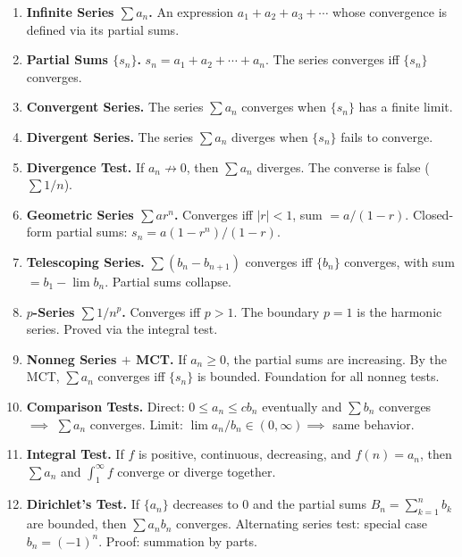 \documentclass[worksheet]{workbook}
\begin{document}
\begin{enumerate}[label=\textbf{\Alph*.}, leftmargin=2.5em, itemsep=1pt]

\item \textbf{Infinite Series $\sum a_n$.}  An expression $a_1 + a_2 + a_3 + \cdots$ whose convergence is defined via its partial sums.

\item \textbf{Partial Sums $\{s_n\}$.}  $s_n = a_1 + a_2 + \cdots + a_n$. The series converges iff $\{s_n\}$ converges.

\item \textbf{Convergent Series.}  The series $\sum a_n$ converges when $\{s_n\}$ has a finite limit.

\item \textbf{Divergent Series.}  The series $\sum a_n$ diverges when $\{s_n\}$ fails to converge.

\item \textbf{Divergence Test.}  If $a_n \not\to 0$, then $\sum a_n$ diverges.  The converse is false ($\sum 1/n$).

\item \textbf{Geometric Series $\sum ar^n$.}  Converges iff $|r| < 1$, sum $= a/(1-r)$.  Closed-form partial sums: $s_n = a(1-r^n)/(1-r)$.

\item \textbf{Telescoping Series.}  $\sum (b_n - b_{n+1})$ converges iff $\{b_n\}$ converges, with sum $= b_1 - \lim b_n$.  Partial sums collapse.

\item \textbf{$p$-Series $\sum 1/n^p$.}  Converges iff $p > 1$.  The boundary $p = 1$ is the harmonic series.  Proved via the integral test.

\item \textbf{Nonneg Series $+$ MCT.}  If $a_n \geq 0$, the partial sums are increasing.  By the MCT, $\sum a_n$ converges iff $\{s_n\}$ is bounded.  Foundation for all nonneg tests.

\item \textbf{Comparison Tests.}  Direct: $0 \leq a_n \leq cb_n$ eventually and $\sum b_n$ converges $\implies$ $\sum a_n$ converges.  Limit: $\lim a_n/b_n \in (0, \infty) \implies$ same behavior.

\item \textbf{Integral Test.}  If $f$ is positive, continuous, decreasing, and $f(n) = a_n$, then $\sum a_n$ and $\int_1^\infty f$ converge or diverge together.

\item \textbf{Dirichlet's Test.}  If $\{a_n\}$ decreases to $0$ and the partial sums $B_n = \sum_{k=1}^n b_k$ are bounded, then $\sum a_n b_n$ converges.  Alternating series test: special case $b_n = (-1)^n$.  Proof: summation by parts.


\end{enumerate}
\end{document}

